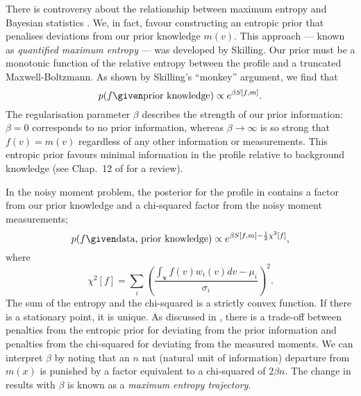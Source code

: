 \documentclass{article}
\begin{document}
There is controversy about the relationship between maximum entropy and Bayesian statistics . We, in fact, favour constructing an entropic prior that penalises deviations from our prior knowledge $m(v)$. This approach --- known as \emph{quantified maximum entropy} --- was developed by Skilling\cite{skilling}. Our prior must be a monotonic function of the relative entropy between the profile and a truncated Maxwell-Boltzmann. As shown by Skilling's ``monkey'' argument\cite{skilling}, we find that
\begin{equation}
p(f\given \text{prior knowledge}) \propto e^{\beta S[f, m]}.
\end{equation}
The regularisation parameter $\beta$ describes the strength of our prior information: $\beta = 0$ corresponds to no prior information, whereas $\beta\to\infty$ is so strong that $f(v) = m(v)$ regardless of any other information or measurements. This entropic prior favours minimal information in the profile relative to background knowledge (see Chap.~12 of  for a review). 


In the noisy moment problem, the posterior for the profile in  contains a factor from our prior knowledge and a chi-squared factor from the noisy moment measurements;
\begin{equation}\label{eq:pdf}
p(f\given \text{data, prior knowledge}) \propto e^{\beta S[f, m] -\frac12\chi^2[f]},
\end{equation}
where
\begin{equation}
\chi^2[f] = \sum_i \left(\frac{\int_{\mathbf v} f(v) w_i(v) dv - \mu_i}{\sigma_i}\right)^2.
\end{equation}
The sum of the entropy and the chi-squared is a strictly convex function. If there is a stationary point, it is unique. As discussed in , there is a trade-off between penalties from the entropic prior for deviating from the prior information and penalties from the chi-squared for deviating from the measured moments. We can interpret $\beta$ by noting that an $n$ nat (natural unit of information) departure from $m(x)$  is punished by a factor equivalent to a chi-squared of $2\beta n$. The change in results with $\beta$ is known as a \emph{maximum entropy trajectory}. 
\end{document}
